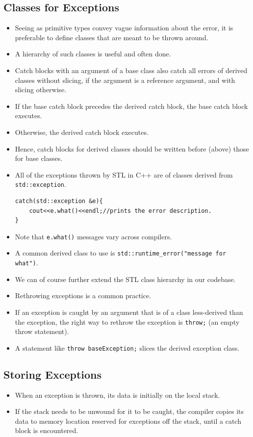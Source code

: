 \documentclass{report}
\begin{document}
\subsection{Classes for Exceptions}
\begin{itemize}
\item Seeing as primitive types convey vague information about the error, it is
preferable to define classes that are meant to be thrown around.
\item A hierarchy of such classes is useful and often done.
\item Catch blocks with an argument of a base class also catch all errors of derived classes
without slicing, if the argument is a reference argument, and with slicing otherwise.
\item If the base catch block precedes the derived catch block, the base catch block executes.
\item Otherwise, the derived catch block executes.
\item Hence, catch blocks for derived classes should be written before (above) those for base classes.
\item All of the exceptions thrown by STL in C++ are of classes derived from \texttt{std::exception}.
\begin{lstlisting}
catch(std::exception &e){
    cout<<e.what()<<endl;//prints the error description.
}
\end{lstlisting}
\item Note that \texttt{e.what()} messages vary across compilers.
\item A common derived class to use is \texttt{std::runtime\_error("message for what")}.
\item We can of course further extend the STL class hierarchy in our codebase.
\item Rethrowing exceptions is a common practice.
\item If an exception is caught by an argument that is of a class less-derived than the exception,
the right way to rethrow the exception is \texttt{throw;} (an empty throw statement).
\item A statement like \texttt{throw baseException;} slices the derived exception class.
\end{itemize}
\subsection{Storing Exceptions}
\begin{itemize}
\item When an exception is thrown, its data is initially on the local stack.
\item If the stack needs to be unwound for it to be caught, the compiler copies
its data to memory location reserved for exceptions off the stack, until
a catch block is encountered.
\end{itemize}
\end{document}
